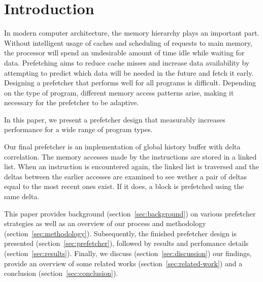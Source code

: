 \section{Introduction}
\label{sec:introduction}

In modern computer architecture, the memory hierarchy plays an important part.
Without intelligent usage of caches and scheduling of requests to main memory, the processor will spend an undesirable amount of time idle while waiting for data.
Prefetching aims to reduce cache misses and increase data availability by attempting to predict which data will be needed in the future and fetch it early. 
Designing a prefetcher that performs well for all programs is difficult.
Depending on the type of program, different memory access patterns arise, making it necessary for the prefetcher to be adaptive.

In this paper, we present a prefetcher design that measurably increases performance for a wide range of program types.

Our final prefetcher is an implementation of global history buffer with delta correlation.
The memory accesses made by the instructions are stored in a linked list.
When an instruction is encountered again, the linked list is traversed and the deltas between the earlier accesses are examined to see wether a pair of deltas equal to the most recent ones exist.
If it does, a block is prefetched using the same delta.

This paper provides background (section~\ref{sec:background}) on various prefetcher strategies as well as an overview of our process and methodology (section~\ref{sec:methodology}).
Subsequently, the finished prefetcher design is presented (section~\ref{sec:prefetcher}), followed by results and perfomance details (section~\ref{sec:results}).
Finally, we discuss (section~\ref{sec:discussion}) our findings, provide an overview of some related works (section~\ref{sec:related-work}) and a conclusion (section~\ref{sec:conclusion}).

